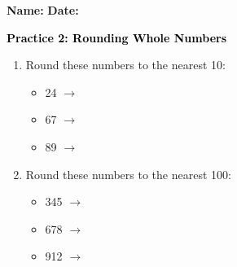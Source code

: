 \documentclass[12pt, letterpaper, fleqn]{article}
\newcommand{\blank}{\underline{\hspace{2.2cm}}}
\begin{document}
\textbf{Name:} \underline{\hspace{5cm}}
\hfill
\textbf{Date:} \underline{\hspace{3cm}}\\

\begin{tcolorbox}[colback=customteal!20]
    \large\textcolor{black}{\textbf{Practice 2: Rounding Whole Numbers}}
\end{tcolorbox}

\vspace{5mm}
\begin{enumerate}[itemsep=2.5cm, leftmargin=0.6cm]
\item Round these numbers to the nearest 10:
\begin{itemize}[itemsep=0.8cm]
  \item 24 $\rightarrow$ \blank
  \item 67 $\rightarrow$ \blank
  \item 89 $\rightarrow$ \blank
\end{itemize}

\item Round these numbers to the nearest 100:
\begin{itemize}[itemsep=0.8cm]
  \item 345 $\rightarrow$ \blank
  \item 678 $\rightarrow$ \blank
  \item 912 $\rightarrow$ \blank
\end{itemize}
\end{enumerate}
\end{document}
